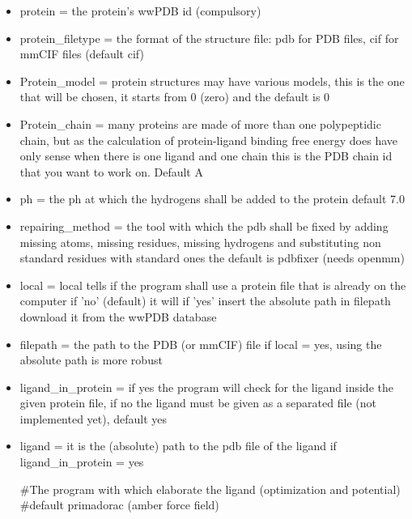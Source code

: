 			\begin{itemize}
				
				\item protein = the protein's wwPDB id (compulsory) 

				\item protein\_filetype = the format of the structure file: pdb for PDB files, cif for mmCIF files (default cif)
				
				\item Protein\_model = protein structures may have various models, this is the one that will be chosen, it starts from 0 (zero) and the default is 0
				
				\item Protein\_chain = many proteins are made of more than one polypeptidic chain, but as the calculation of protein-ligand binding free energy does have only sense when there is one ligand and one chain this is the PDB chain id that you want to work on. Default A
				
				\item ph = the ph at which the hydrogens shall be added to the protein default 7.0
				
				\item repairing\_method = the tool with which the pdb shall be fixed by adding missing atoms, missing residues, missing hydrogens and substituting non standard residues with standard ones the default is pdbfixer\cite{pdbfixer} (needs openmm\cite{openmm})
				
				\item local = local tells if the program shall use a protein file that is already on the computer if 'no' (default) it will if 'yes' insert the absolute path in filepath download it from the wwPDB database
				
				\item filepath = the path to the PDB (or mmCIF) file if local = yes, using the absolute path is more robust
				
				\item ligand\_in\_protein = if yes the program will check for the ligand inside the given protein file, if no the ligand must be given as a separated file (not implemented yet), default yes
				
				\item ligand = it is the (absolute) path to the pdb file of the ligand if ligand\_in\_protein = yes
				
				\#The program with which elaborate the ligand (optimization and potential)
				\#default primadorac (amber force field)
				

\end{itemize}
